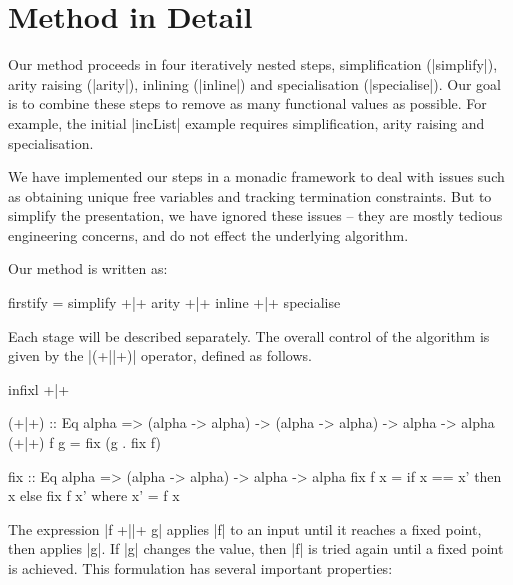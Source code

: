 \documentclass[preprint]{sigplanconf}
\begin{document}
\section{Method in Detail}
\label{sec:detailed}

\begin{comment}
\begin{code}
data Prog = Prog deriving Eq
simplify,arity,inline,specialise :: Prog -> Prog
\end{code}
\end{comment}

Our method proceeds in four iteratively nested steps, simplification (|simplify|), arity raising (|arity|), inlining (|inline|) and specialisation (|specialise|). Our goal is to combine these steps to remove as many functional values as possible. For example, the initial |incList| example requires simplification, arity raising and specialisation.

We have implemented our steps in a monadic framework to deal with issues such as obtaining unique free variables and tracking termination constraints. But to simplify the presentation, we have ignored these issues -- they are mostly tedious engineering concerns, and do not effect the underlying algorithm.

Our method is written as:

\begin{code}
firstify = simplify +|+ arity +|+ inline +|+ specialise
\end{code}

Each stage will be described separately. The overall control of the algorithm is given by the |(+||+)| operator, defined as follows.

\begin{code}
infixl +|+

(+|+) :: Eq alpha => (alpha -> alpha) -> (alpha -> alpha) -> alpha -> alpha
(+|+) f g = fix (g . fix f)

fix :: Eq alpha => (alpha -> alpha) -> alpha -> alpha
fix f x = if x == x' then x else fix f x'
    where x' = f x
\end{code}

The expression |f +||+ g| applies |f| to an input until it reaches a fixed point, then applies |g|. If |g| changes the value, then |f| is tried again until a fixed point is achieved. This formulation has several important properties:
\end{document}
